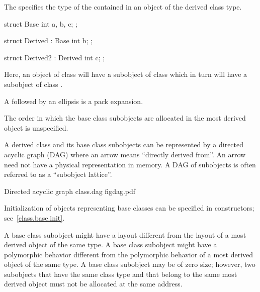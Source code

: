 \pnum
The  specifies the type of the
 contained in an
object of the derived class type.
\begin{example}
\begin{codeblock}
struct Base {
  int a, b, c;
};
\end{codeblock}

\begin{codeblock}
struct Derived : Base {
  int b;
};
\end{codeblock}

\begin{codeblock}
struct Derived2 : Derived {
  int c;
};
\end{codeblock}

Here, an object of class  will have a subobject of class
 which in turn will have a subobject of class
.
\end{example}

\pnum
A  followed by an ellipsis is a pack
expansion.

\pnum
The order in which the base class subobjects are allocated in the most
derived object is unspecified.
\begin{note}
%
%
A derived class and its base class subobjects can be represented by a
directed acyclic graph (DAG) where an arrow means ``directly derived
from''. An arrow need not have a physical representation in memory.
A DAG of subobjects is often referred to as a ``subobject lattice''.

\begin{importgraphic}
{Directed acyclic graph}
{class.dag}
{figdag.pdf}
\end{importgraphic}
\end{note}

\pnum
\begin{note}
Initialization of objects representing base classes can be specified in
constructors; see~\ref{class.base.init}.
\end{note}

\pnum
\begin{note}
A base class subobject might have a layout different
from the layout of a most derived object of the same type. A base class
subobject might have a polymorphic behavior
different from the polymorphic behavior of a most derived object of the
same type. A base class subobject may be of zero size;
however, two subobjects that have the same class type and that belong to
the same most derived object must not be allocated at the same
address.
\end{note}

